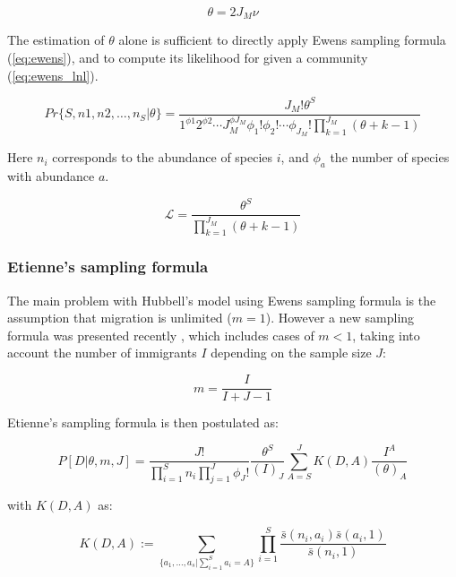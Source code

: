 \begin{equation} \label{eq:theta}
\theta = 2J_M\nu
\end{equation}

The estimation of $\theta$ alone is sufficient to directly apply Ewens sampling formula (\autoref{eq:ewens}), and to compute its likelihood for given a community (\autoref{eq:ewens_lnl}).

\begin{equation} \label{eq:ewens}
Pr\{S,n1,n2,\ldots,n_S|\theta\} = \frac{J_M!\theta^S}{1^{\phi1} 2^{\phi2} \cdots J_M^{\phi J_M} \phi_1! \phi_2! \cdots \phi_{J_M}! \prod_{k=1}^{J_M} (\theta + k - 1)}
\end{equation}

Here $n_i$ corresponds to the abundance of species $i$, and $\phi_a$ the number of species with abundance $a$.

\begin{equation} \label{eq:ewens_lnl}
\mathcal{L} = \frac{\theta^S}{\prod_{k=1}^{J_M} (\theta + k - 1)}
\end{equation}

\subsubsection{Etienne's sampling formula}
\label{sec:etienne-model}

The main problem with Hubbell's model using Ewens sampling formula is the assumption that migration is unlimited ($m=1$). However a new sampling formula was presented recently \cite{Etienne2005}, which includes cases of $m<1$, taking into account the number of immigrants $I$ depending on the sample size $J$:

\begin{equation} \label{eq:m}
m = \frac{I}{I+J-1}
\end{equation}

Etienne's sampling formula is then postulated as:

\begin{equation} \label{eq:etienne_lnl}
P[D|\theta,m,J] = \frac{J!}{\prod_{i=1}^Sn_i \prod_{j=1}^J\phi_J!} \frac{\theta^S}{(I)_J} \sum_{A=S}^JK(D,A) \frac{I^A}{(\theta)_A}
\end{equation}

with $K(D,A)$ as:

\begin{equation} \label{eq:kda}
K(D,A) := \sum_{\{a_1,\ldots,a_s|\sum_{i=1}^Sa_i=A\}}\prod_{i=1}^S\frac{\bar{s}(n_i,a_i)\bar{s}(a_i,1)}{\bar{s}(n_i,1)}
\end{equation}

